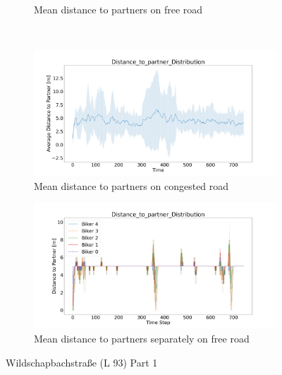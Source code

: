 \begin{figure}[H]
\begin{subfigure}[b]{0.45\textwidth}
		\caption{Mean distance to partners on free road}
	\end{subfigure}
	\\
	\begin{subfigure}[b]{0.45\textwidth}
		\centering
		\includegraphics[width=1.0\textwidth]{images/Wildschapbachstrase/Wildschapbachstrase_AVG_Distance_to_partner_distribution_congested.png}
		\caption{Mean distance to partners on congested road}
	\end{subfigure}
	\hfill
	\begin{subfigure}[b]{0.45\textwidth}
		\centering
		\includegraphics[width=1.0\textwidth]{images/Wildschapbachstrase/Wildschapbachstrase_Distance_to_partner_distribution_free.png}
		\caption{Mean distance to partners separately on free road}
	\end{subfigure}
	\caption{Wildschapbachstraße (L 93) Part 1}
\end{figure}

